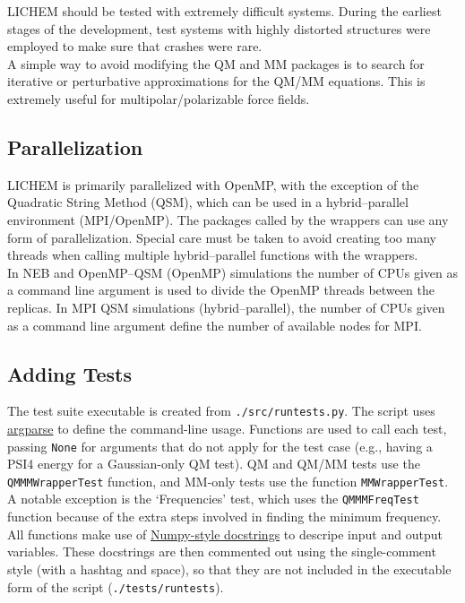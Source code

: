 \documentclass[12pt]{report}
\begin{document}
LICHEM should be tested with extremely difficult systems.
During the earliest stages of the development, test systems with highly
distorted structures were employed to make sure that crashes were rare. \\

A simple way to avoid modifying the QM and MM packages is to search for
iterative or perturbative approximations for the QM/MM equations.
This is extremely useful for multipolar/polarizable force fields.

\subsection{Parallelization}

LICHEM is primarily parallelized with OpenMP, with the exception
of the Quadratic String Method (QSM), which can be used in a
hybrid--parallel environment (MPI/OpenMP).  The packages called by the
wrappers can use any form of parallelization.
Special care must be taken to avoid creating too many threads when calling
multiple hybrid--parallel functions with the wrappers. \\

In NEB and OpenMP--QSM (OpenMP) simulations the number of CPUs given as a
command line argument is used to divide the OpenMP threads between the replicas.
In MPI QSM simulations (hybrid--parallel), the number of CPUs given as a
command line argument define the number of available nodes for MPI.

\subsection{Adding Tests}

The test suite executable is created from \texttt{./src/runtests.py}.
The script uses
\href{https://docs.python.org/3.10/library/argparse.html}{argparse}
to define the command-line usage.
Functions are used to call each test, passing \texttt{None} for 
arguments that do not apply for the test case (e.g., having a 
PSI4 energy for a Gaussian-only QM test).
QM and QM/MM tests use the \texttt{QMMMWrapperTest} function, 
and MM-only tests use the function \texttt{MMWrapperTest}.
A notable exception is the `Frequencies' test, which uses the 
\texttt{QMMMFreqTest} function because of the extra steps involved
in finding the minimum frequency. \\

All functions make use of 
\href{https://numpydoc.readthedocs.io/en/latest/format.html#docstring-standard}{Numpy-style docstrings} 
to descripe input and output variables.
These docstrings are then commented out using the single-comment style
(with a hashtag and space), so that they are not included in the executable
form of the script (\texttt{./tests/runtests}).
\end{document}
